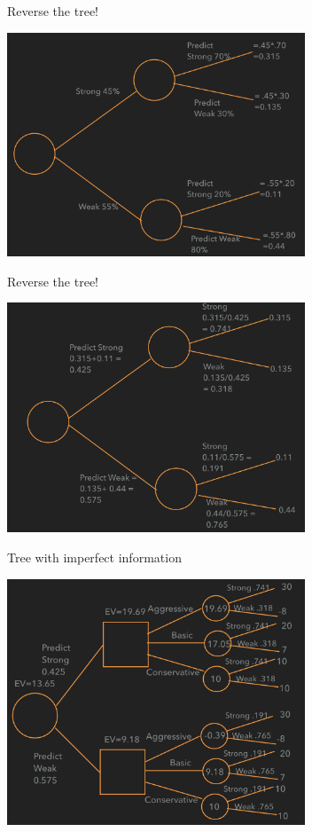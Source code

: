\documentclass{beamer}\usepackage[]{graphicx}\usepackage[]{color}
\begin{document}
\begin{darkframes}
\begin{frame}[fragile]{Reverse the tree!}
      \begin{center}
        \includegraphics[width=3.5in]{BeforeFlip} \\
      \end{center}

    \end{frame}


    \begin{frame}[fragile]{Reverse the tree!}

      \begin{center}
        \includegraphics[width=3.5in]{AfterFlip} \\
      \end{center}

    \end{frame}


    \begin{frame}[fragile]{Tree with imperfect information}
       
      \begin{center}
        \includegraphics[width=3.5in]{BevoImperfect} \\
      \end{center}


\end{frame}
\end{darkframes}
\end{document}
